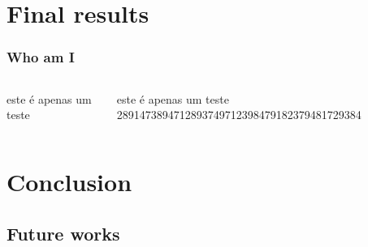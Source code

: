 \documentclass[9pt, compress]{beamer}
\begin{document}
    \section{Final results}
    \begin{frame}
        \frametitle{Who am I}
        \begin{columns}
          \begin{column}{0.5\textwidth}
            este é apenas um teste 
          \end{column}
          \begin{column}{0.5\textwidth}
            este é apenas um teste 2891473894712893749712398479182379481729384
          \end{column}
        \end{columns}
    \end{frame}
    \section{Conclusion}
     \subsection{Future works}
\end{document}
